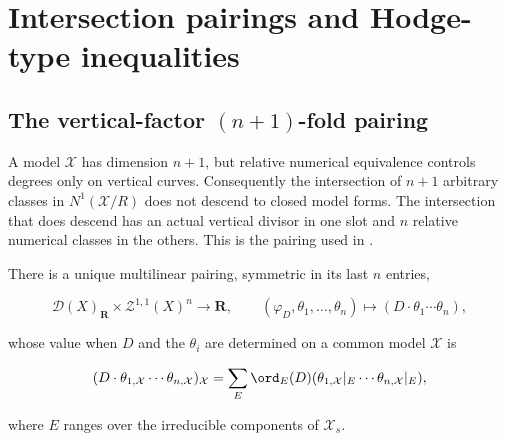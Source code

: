 \section{Intersection pairings and Hodge-type inequalities}
\label{sec:ch20-intersection}

\subsection{The vertical-factor \texorpdfstring{$(n+1)$}{(n+1)}-fold pairing}
\label{sec:ch20-pairing}

A model $\mathcal X$ has dimension $n+1$, but relative numerical
equivalence controls degrees only on vertical curves.  Consequently the
intersection of $n+1$ arbitrary classes in $N^1(\mathcal X/R)$ does not
descend to closed model forms.  The intersection that does descend has an
actual vertical divisor in one slot and $n$ relative numerical classes in
the others.  This is the pairing used in \cite[\S2.7]{BFJ15}.

\begin{proposition}
\label{prop:ch20-intersection-pairing}
There is a unique multilinear pairing, symmetric in its last $n$ entries,

\begin{equation}
\label{eq:ch20-intersection-pairing}
 \mathcal D(X)_{\mathbf R}\times\mathcal Z^{1,1}(X)^n
 \longrightarrow\mathbf R,
 \qquad
 (\varphi_D,\theta_1,\ldots,\theta_n)\longmapsto
 (D\cdot\theta_1\cdots\theta_n),
\end{equation}

whose value when $D$ and the $\theta_i$ are determined on a common model
$\mathcal X$ is

\[
 (D\cdot\theta_{1,\mathcal X}\cdots\theta_{n,\mathcal X})_{\mathcal X}
 =\sum_E\ord_E(D)
   (\theta_{1,\mathcal X}|_E\cdots\theta_{n,\mathcal X}|_E),
\]

where $E$ ranges over the irreducible components of $\mathcal X_s$.
\end{proposition}


